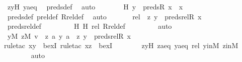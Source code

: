 \begin{isabellebody}
\ zyH\ yaeq\ \isamarkupfalse%
\ preds{\isacharunderscore}{\kern0pt}def\ \isamarkupfalse%
\ auto\isanewline
\ \ \ \ \isamarkupfalse%
\ \isamarkupfalse%
\ H{}{\isacharcolon}{\kern0pt}\ {\isachardoublequoteopen}y\ {\isasymin}\ preds{\isacharparenleft}{\kern0pt}R{\isacharcomma}{\kern0pt}\ x{\isacharparenright}{\kern0pt}\ {\isasymunion}\ {\isacharbraceleft}{\kern0pt}x{\isacharbraceright}{\kern0pt}{\isachardoublequoteclose}\ \isamarkupfalse%
\ preds{\isacharunderscore}{\kern0pt}def\ prel{\isacharunderscore}{\kern0pt}def\ Rrel{\isacharunderscore}{\kern0pt}def\ \isamarkupfalse%
\ auto\ \isanewline
\isanewline
\ \ \ \ \isamarkupfalse%
\ rel{\isacharprime}{\kern0pt}\ {\isacharcolon}{\kern0pt}\ {\isachardoublequoteopen}{\isacharless}{\kern0pt}z{\isacharcomma}{\kern0pt}\ y{\isachargreater}{\kern0pt}\ {\isasymin}\ preds{\isacharunderscore}{\kern0pt}rel{\isacharparenleft}{\kern0pt}R{\isacharcomma}{\kern0pt}\ x{\isacharparenright}{\kern0pt}{\isachardoublequoteclose}\ \isanewline
\ \ \ \ \ \ \isamarkupfalse%
\ preds{\isacharunderscore}{\kern0pt}rel{\isacharunderscore}{\kern0pt}def\ \isanewline
\ \ \ \ \ \ \isamarkupfalse%
\ H{}\ H{}\ rel\ Rrel{\isacharunderscore}{\kern0pt}def\ \isanewline
\ \ \ \ \ \ \isamarkupfalse%
\ auto\isanewline
\isanewline
\ \ \ \ \isamarkupfalse%
\ {\isachardoublequoteopen}{\isasymexists}y{\isasymin}M{\isachardot}{\kern0pt}\ {\isasymexists}z{\isasymin}M{\isachardot}{\kern0pt}\ v\ {\isacharequal}{\kern0pt}\ {\isasymlangle}{\isasymlangle}z{\isacharcomma}{\kern0pt}\ a{\isasymrangle}{\isacharcomma}{\kern0pt}\ y{\isacharcomma}{\kern0pt}\ a{\isasymrangle}\ {\isasymand}\ {\isasymlangle}z{\isacharcomma}{\kern0pt}\ y{\isasymrangle}\ {\isasymin}\ preds{\isacharunderscore}{\kern0pt}rel{\isacharparenleft}{\kern0pt}R{\isacharcomma}{\kern0pt}\ x{\isacharparenright}{\kern0pt}{\isachardoublequoteclose}\ \isanewline
\ \ \ \ \ \ \isamarkupfalse%
{\isacharparenleft}{\kern0pt}rule{\isacharunderscore}{\kern0pt}tac\ x{\isacharequal}{\kern0pt}y\ \ bexI{\isacharcomma}{\kern0pt}\ rule{\isacharunderscore}{\kern0pt}tac\ x{\isacharequal}{\kern0pt}z\ \ bexI{\isacharparenright}{\kern0pt}\isanewline
\ \ \ \ \ \ \isamarkupfalse%
\ zyH\ zaeq\ yaeq\ rel{\isacharprime}{\kern0pt}\ yinM\ zinM\ \isanewline
\ \ \ \ \ \ \isamarkupfalse%
\ auto\isanewline
\ \ \isamarkupfalse%

\end{isabellebody}
